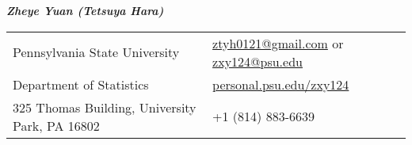 \documentclass[utf8,letterpaper,oneside]{article}
\begin{document}
\noindent  \textit{\textbf{Zheye Yuan (Tetsuya Hara)}}%
\small
\begin{center}
 \begin{tabular}{l l}
  Pennsylvania State University                  & \hspace{1in} \href{mailto:ztyh0121@gmail.com}{ztyh0121@gmail.com} or \href{mailto:zxy124@psu.edu}{zxy124@psu.edu} \\
  Department of Statistics                       & \hspace{1in}   \href{http://personal.psu.edu/zxy124/}{personal.psu.edu/zxy124}                                    \\
  325 Thomas Building, University Park, PA 16802 & \hspace{1in}+1 (814) 883-6639                                                                                     \\
 \end{tabular}
\end{center}
\noindent
\end{document}
